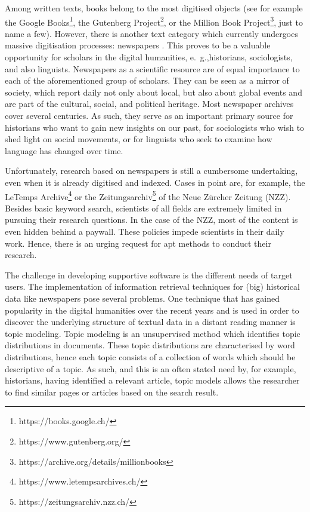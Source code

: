 Among written texts, books belong to the most digitised objects (see for example the Google Books\footnote{https://books.google.ch/}, the Gutenberg Project\footnote{https://www.gutenberg.org/}, or the Million Book Project\footnote{https://archive.org/details/millionbooks}, just to name a few). However, there is another text category which currently undergoes massive digitisation processes: newspapers \citep{lansdall-welfarecontent2017,prestondigital2016,binghamdigitization2010}. This proves to be a valuable opportunity for scholars in the digital humanities, e.~g.,historians, sociologists, and also linguists. Newspapers as a scientific resource are of equal importance to each of the aforementioned group of scholars. They can be seen as a mirror of society, which report daily not only about local, but also about global events and are part of the cultural, social, and political heritage. Most newspaper archives cover several centuries. As such, they serve as an important primary source for historians who want to gain new insights on our past, for sociologists who wish to shed light on social movements, or for linguists who seek to examine how language has changed over time.

Unfortunately, research based on newspapers is still a cumbersome undertaking, even when it is already digitised and indexed. Cases in point are, for example, the LeTemps Archive\footnote{https://www.letempsarchives.ch/} or the Zeitungsarchiv\footnote{https://zeitungsarchiv.nzz.ch/} of the Neue Zürcher Zeitung (NZZ). Besides basic keyword search, scientists of all fields are extremely limited in pursuing their research questions. In the case of the NZZ, most of the content is even hidden behind a paywall. These policies impede scientists in their daily work. Hence, there is an urging request for apt methods to conduct their research.

The challenge in developing supportive software is the different needs of target users. The implementation of information retrieval techniques for (big) historical data like newspapers pose several problems. One technique that has gained popularity in the digital humanities over the recent years and is used in order to discover the underlying structure of textual data in a distant reading manner is topic modeling\citep{Yang:2011:TMH:2107636.2107649,weingart2012}. Topic modeling is an unsupervised method which identifies topic distributions in documents. These topic distributions are characterised by word distributions, hence each topic consists of a collection of words which should be descriptive of a topic. As such, and this is an often stated need by, for example, historians, having identified a relevant article, topic models allows the researcher to find similar pages or articles based on the search result.

